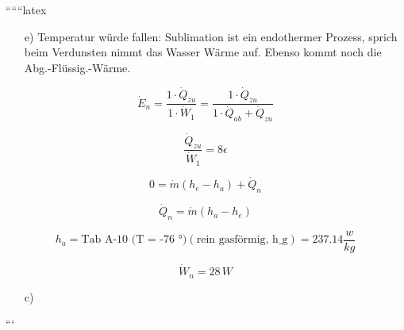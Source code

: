 ``````latex


\begin{itemize}
    \item[e)] Temperatur würde fallen: Sublimation ist ein endothermer Prozess, sprich beim Verdunsten nimmt das Wasser Wärme auf. Ebenso kommt noch die Abg.-Flüssig.-Wärme.
\end{itemize}

\[
\dot{E}_n = \frac{1 \cdot \dot{Q}_{zu}}{1 \cdot \dot{W}_1} = \frac{1 \cdot \dot{Q}_{zu}}{1 \cdot \dot{Q}_{ab} + \dot{Q}_{zu}}
\]

\[
\frac{\dot{Q}_{zu}}{\dot{W}_1} = 8 \epsilon
\]

\[
0 = \dot{m}(h_e - h_a) + \dot{Q}_n
\]

\[
\dot{Q}_n = \dot{m}(h_a - h_e)
\]

\[
h_a = \text{Tab A-10 (T = -76 °)} \left( \text{rein gasförmig, h_g} \right) = 237.14 \frac{w}{kg}
\]

\[
\dot{W}_n = 28 \, W
\]

\begin{itemize}
    \item[c)]
\end{itemize}

```